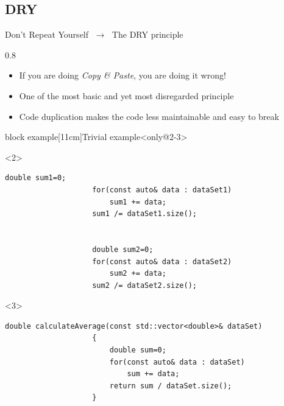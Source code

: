 
\subsection{DRY}
\begin{frame}[fragile]{Don't Repeat Yourself $\;\to\;$ The DRY principle}
    \vspace{1mm}
    \begin{overlayarea}{\textwidth}{0.8\textheight}
        \begin{itemize}
            \item If you are doing \alert{\emph{Copy \& Paste}}, you are doing it wrong!
            \item One of the most basic and yet most disregarded principle
            \item Code duplication makes the code less maintainable and easy to break
        \end{itemize}
        \begin{varblock}{block example}[11cm]{Trivial example}<only@2-3>
            \begin{onlyenv}<2>
                \begin{lstlisting}[style=MyCpp]
                    double sum1=0;
                    for(const auto& data : dataSet1)
                        sum1 += data;
                    sum1 /= dataSet1.size();


                    double sum2=0;
                    for(const auto& data : dataSet2)
                        sum2 += data;
                    sum2 /= dataSet2.size();
                \end{lstlisting}
            \end{onlyenv}
            \begin{onlyenv}<3>
                \begin{lstlisting}[style=MyCpp]
                    double calculateAverage(const std::vector<double>& dataSet)
                    {
                        double sum=0;
                        for(const auto& data : dataSet)
                            sum += data;
                        return sum / dataSet.size();
                    }


\end{lstlisting}
\end{onlyenv}
\end{varblock}
\end{overlayarea}
\end{frame}
